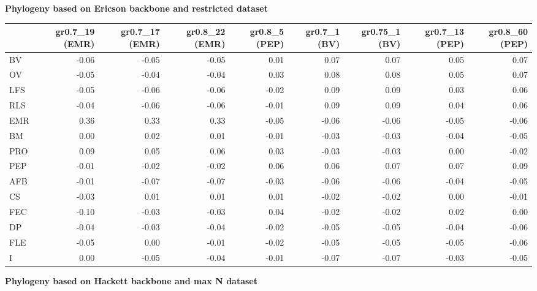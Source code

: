 \begin{landscape}
\begin{table}
\begin{footnotesize}
\textbf{Phylogeny based on Ericson backbone and restricted dataset}

\begin{tabular}{@{}l|rrrrrrrr@{}}
\toprule
  & gr0.7\_19 (EMR) & gr0.7\_17 (EMR) & gr0.8\_22 (EMR) & gr0.8\_5 (PEP) & gr0.7\_1 (BV) & gr0.75\_1 (BV) & gr0.7\_13 (PEP) & gr0.8\_60 (PEP)\\
\midrule
BV & -0.06 & -0.05 & -0.05 & 0.01 & 0.07 & 0.07 & 0.05 & 0.07\\
OV & -0.05 & -0.04 & -0.04 & 0.03 & 0.08 & 0.08 & 0.05 & 0.07\\
LFS & -0.05 & -0.06 & -0.06 & -0.02 & 0.09 & 0.09 & 0.03 & 0.06\\
RLS & -0.04 & -0.06 & -0.06 & -0.01 & 0.09 & 0.09 & 0.04 & 0.06\\
EMR & 0.36 & 0.33 & 0.33 & -0.05 & -0.06 & -0.06 & -0.05 & -0.06\\
BM & 0.00 & 0.02 & 0.01 & -0.01 & -0.03 & -0.03 & -0.04 & -0.05\\
PRO & 0.09 & 0.05 & 0.06 & 0.03 & -0.03 & -0.03 & 0.00 & -0.02\\
PEP & -0.01 & -0.02 & -0.02 & 0.06 & 0.06 & 0.07 & 0.07 & 0.09\\
AFB & -0.01 & -0.07 & -0.07 & -0.03 & -0.06 & -0.06 & -0.04 & -0.05\\
CS & -0.03 & 0.01 & 0.01 & 0.01 & -0.02 & -0.02 & 0.00 & -0.01\\
FEC & -0.10 & -0.03 & -0.03 & 0.04 & -0.02 & -0.02 & 0.02 & 0.00\\
DP & -0.04 & -0.03 & -0.04 & -0.02 & -0.05 & -0.05 & -0.04 & -0.06\\
FLE & -0.05 & 0.00 & -0.01 & -0.02 & -0.05 & -0.05 & -0.05 & -0.06\\
I & 0.00 & -0.05 & -0.04 & -0.01 & -0.07 & -0.07 & -0.03 & -0.05\\
\bottomrule
\end{tabular}
\end{footnotesize}
\end{table}


\clearpage%

\begin{table}
\center
\begin{footnotesize}

\textbf{Phylogeny based on Hackett backbone and max N dataset}


\end{footnotesize}
\end{table}
\end{landscape}
